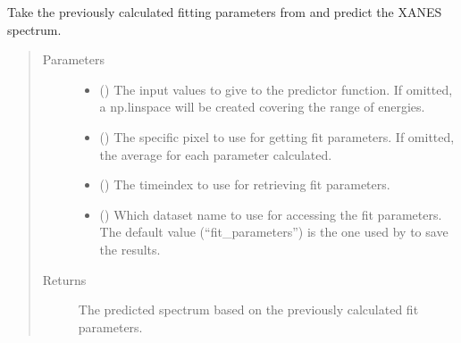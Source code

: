 \documentclass[letterpaper,10pt,english]{sphinxmanual}
\begin{document}
\begin{fulllineitems}
\begin{fulllineitems}
\begin{quote}
\begin{description}
\end{description}\end{quote}

\end{fulllineitems}


\begin{fulllineitems}
\label{\detokenize{xanespy:xanespy.xanes_frameset.XanesFrameset.fitted_spectrum}}
Take the previously calculated fitting parameters from
 and predict the XANES spectrum.
\begin{quote}\begin{description}
\item[{Parameters}] \leavevmode\begin{itemize}
\item {} 
 (\sphinxstyleliteralemphasis{, }) \textendash{} The input values to give to the predictor function. If
omitted, a np.linspace will be created covering the range of
energies.

\item {} 
 (\sphinxstyleliteralemphasis{, }) \textendash{} The specific pixel to use for getting fit parameters. If
omitted, the average for each parameter calculated.

\item {} 
 (\sphinxstyleliteralemphasis{, }) \textendash{} The timeindex to use for retrieving fit parameters.

\item {} 
 (\sphinxstyleliteralemphasis{, }) \textendash{} Which dataset name to use for accessing the fit
parameters. The default value (“fit\_parameters”) is the one
used by  to save the results.

\end{itemize}

\item[{Returns}] \leavevmode
{} \textendash{} The predicted spectrum based on the previously calculated
fit parameters.


\end{description}
\end{quote}
\end{fulllineitems}
\end{fulllineitems}
\end{document}
